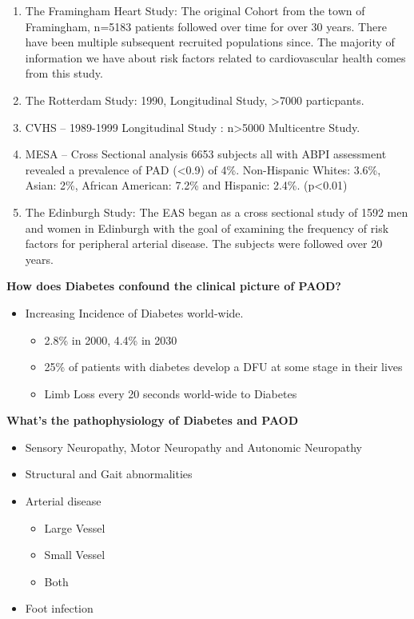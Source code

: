 \documentclass[
]{book}
\begin{document}
\begin{enumerate}
\def\labelenumi{\arabic{enumi}.}
\item
  The Framingham Heart Study: The original Cohort from the town of
  Framingham, n=5183 patients followed over time for over 30 years.
  There have been multiple subsequent recruited populations since. The
  majority of information we have about risk factors related to
  cardiovascular health comes from this study.
  \citep{mahmoodFraminghamHeartStudy2014}
\item
  The Rotterdam Study: 1990, Longitudinal Study, \textgreater7000 particpants.
\item
  CVHS -- 1989-1999 Longitudinal Study : n\textgreater5000 Multicentre Study.
\item
  MESA -- Cross Sectional analysis 6653 subjects all with ABPI
  assessment revealed a prevalence of PAD (\textless0.9) of 4\%. Non-Hispanic
  Whites: 3.6\%, Asian: 2\%, African American: 7.2\% and Hispanic: 2.4\%.
  (p\textless0.01) \citep{allisonEffectNovelCardiovascular2006}
\item
  The Edinburgh Study: The EAS began as a cross sectional study of
  1592 men and women in Edinburgh with the goal of examining the
  frequency of risk factors for peripheral arterial disease. The
  subjects were followed over 20 years.
  \citep{fowkesEdinburghArteryStudy1991}
\end{enumerate}

\textbf{How does Diabetes confound the clinical picture of PAOD?}

\begin{itemize}
\item
  Increasing Incidence of Diabetes world-wide.
  \citep{boultonGlobalBurdenDiabetic2005}

  \begin{itemize}
  \item
    2.8\% in 2000, 4.4\% in 2030
  \item
    25\% of patients with diabetes develop a DFU at some stage in
    their lives
  \item
    Limb Loss every 20 seconds world-wide to Diabetes
  \end{itemize}
\end{itemize}

\textbf{What's the pathophysiology of Diabetes and PAOD}
\citep{armstrong26PathophysiologyPrinciplesManagement2012}

\begin{itemize}
\item
  Sensory Neuropathy, Motor Neuropathy and Autonomic Neuropathy
\item
  Structural and Gait abnormalities
\item
  Arterial disease

  \begin{itemize}
  \item
    Large Vessel
  \item
    Small Vessel
  \item
    Both
  \end{itemize}
\item
  Foot infection\citep{bandyk2018, kayssi2019, lepäntalo2011}
\end{itemize}
\end{document}
